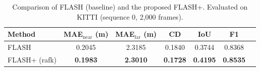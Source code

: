 \begin{table}[t]
\centering
\caption{Comparison of FLASH (baseline) and the proposed FLASH+.
Evaluated on KITTI (sequence 0, 2{,}000 frames).}
\label{tab:comparison}
\begin{tabular}{lcccccc}
\toprule
Method & MAE$_{\text{near}}$ (m) & MAE$_{\text{far}}$ (m) & CD & IoU & F1 \\
\midrule
FLASH & 0.2045 & 2.3185 & 0.1840 & 0.3744 & 0.8368 \\
FLASH+ (rafk) & \textbf{0.1983} & \textbf{2.3010} & \textbf{0.1728} & \textbf{0.4195} & \textbf{0.8535} \\
\bottomrule
\end{tabular}
\end{table}

